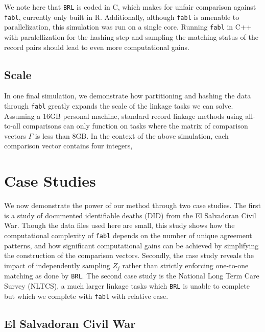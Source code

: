 \documentclass[12pt,letterpaper]{article}
\newcommand{\1}[1]{\mathbb{I}\!\left[#1\right]} %
\begin{document}
We note here that \texttt{BRL} is coded in C, which makes for unfair
comparison against \texttt{fabl}, currently only built in R.
Additionally, although \texttt{fabl} is amenable to parallelization,
this simulation was run on a single core. Running \texttt{fabl} in C++
with paralellization for the hashing step and sampling the matching
status of the record pairs should lead to even more computational gains.

\hypertarget{scale}{%
	\subsection{Scale}\label{scale}}

In one final simulation, we demonstrate how partitioning and hashing the data through \texttt{fabl} greatly expands the scale of the linkage tasks we can solve. Assuming a 16GB personal machine, standard record linkage methods using all-to-all comparisons can only function on tasks where the matrix of comparison vectors $\Gamma$ is less than 8GB. In the context of the above simulation, each comparison vector contains four integers, 

\section{Case Studies}
\label{sex:case-studies}

We now demonstrate the power of our method through two case studies. The first is a study of documented identifiable deaths (DID) from the El Salvadoran Civil War. Though the data files used here are small, this study shows how the computational complexity of \texttt{fabl} depends on the number of unique agreement patterns, and how significant computational gains can be achieved by simplifying the construction of the comparison vectors. Secondly, the case study reveals the impact of independently sampling $Z_j$ rather than strictly enforcing one-to-one matching as done by \texttt{BRL}. The second case study is the National Long Term Care Survey (NLTCS), a much larger linkage tasks which \texttt{BRL} is unable to complete but which we complete with \texttt{fabl} with relative ease. 

\subsection{El Salvadoran Civil War}
\label{el_salvador}
\end{document}
